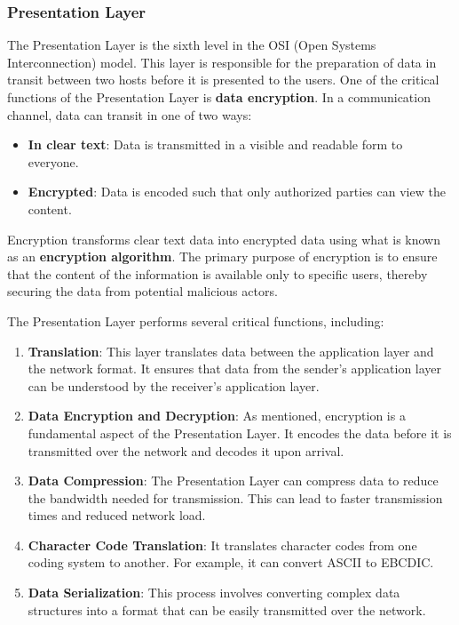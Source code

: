\subsubsection{\textbf{Presentation Layer}}
The Presentation Layer is the sixth level in the OSI (Open Systems Interconnection) model. This layer is responsible for the preparation of data in transit between two hosts before it is presented to the users. One of the critical functions of the Presentation Layer is \textbf{data encryption}. In a communication channel, data can transit in one of two ways:

\begin{itemize}
    \item \textbf{In clear text}: Data is transmitted in a visible and readable form to everyone.
    \item \textbf{Encrypted}: Data is encoded such that only authorized parties can view the content.
\end{itemize}

Encryption transforms clear text data into encrypted data using what is known as an \textbf{encryption algorithm}. The primary purpose of encryption is to ensure that the content of the information is available only to specific users, thereby securing the data from potential malicious actors.

The Presentation Layer performs several critical functions, including:

\begin{enumerate}
    \item \textbf{Translation}: This layer translates data between the application layer and the network format. It ensures that data from the sender's application layer can be understood by the receiver's application layer.
    \item \textbf{Data Encryption and Decryption}: As mentioned, encryption is a fundamental aspect of the Presentation Layer. It encodes the data before it is transmitted over the network and decodes it upon arrival.
    \item \textbf{Data Compression}: The Presentation Layer can compress data to reduce the bandwidth needed for transmission. This can lead to faster transmission times and reduced network load.
    \item \textbf{Character Code Translation}: It translates character codes from one coding system to another. For example, it can convert ASCII to EBCDIC.
    \item \textbf{Data Serialization}: This process involves converting complex data structures into a format that can be easily transmitted over the network.
\end{enumerate}

